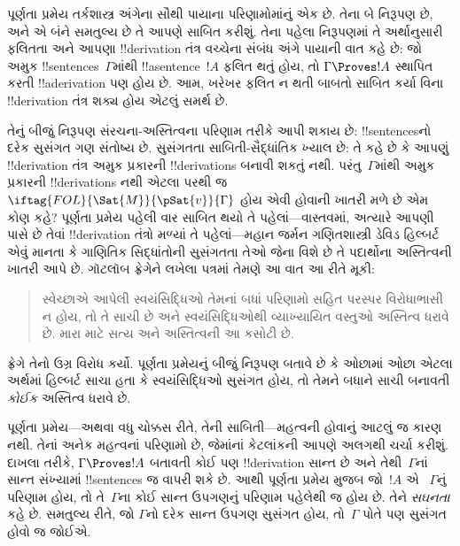\documentclass[../../../include/open-logic-section]{subfiles}
\begin{document}
      {}
      {}


પૂર્ણતા પ્રમેય તર્કશાસ્ત્ર અંગેના સૌથી પાયાના પરિણામોમાંનું એક છે.
તેના બે નિરૂપણ છે, અને એ બંને સમતુલ્ય છે તે આપણે સાબિત કરીશું. તેના
પહેલા નિરૂપણમાં તે અર્થાનુસારી ફલિતતા અને આપણા !!{derivation} તંત્ર
વચ્ચેના સંબંધ અંગે પાયાની વાત કહે છે: જો અમુક !!{sentence}s~$\Gamma$માંથી
!!a{sentence}~$!A$ ફલિત થતું હોય, તો $\Gamma \Proves !A$ સ્થાપિત કરતી
!!a{derivation} પણ હોય છે. આમ, ખરેખર ફલિત ન થતી બાબતો સાબિત કર્યા વિના
!!{derivation} તંત્ર શક્ય હોય એટલું સમર્થ છે.

તેનું બીજું નિરૂપણ સંરચના-અસ્તિત્વના પરિણામ તરીકે આપી શકાય છે:
!!{sentence}sનો દરેક સુસંગત ગણ સંતોષ્ય છે. સુસંગતતા સાબિતી-સૈદ્ધાંતિક
ખ્યાલ છે: તે કહે છે કે આપણું !!{derivation} તંત્ર અમુક પ્રકારની
!!{derivation}s બનાવી શકતું નથી. પરંતુ~$\Gamma$માંથી અમુક પ્રકારની
!!{derivation}s નથી એટલા પરથી જ $\iftag{FOL}{\Sat{M}}{\pSat{v}}{\Gamma}$
હોય એવી 
હોવાની ખાતરી મળે છે એમ કોણ કહે? પૂર્ણતા પ્રમેય પહેલી વાર સાબિત થયો
તે પહેલાં—વાસ્તવમાં, અત્યારે આપણી પાસે છે તેવાં !!{derivation} તંત્રો
મળ્યાં તે પહેલાં—મહાન જર્મન ગણિતશાસ્ત્રી ડેવિડ હિલ્બર્ટ એવું માનતા કે
ગાણિતિક સિદ્ધાંતોની સુસંગતતા તેઓ જેના વિશે છે તે પદાર્થોના અસ્તિત્વની
ખાતરી આપે છે. ગૉટલૉબ ફ્રેગેને લખેલા પત્રમાં તેમણે આ વાત આ રીતે મૂકી:
\begin{quote}
  સ્વેચ્છાએ આપેલી સ્વયંસિદ્ધિઓ તેમનાં બધાં પરિણામો સહિત પરસ્પર
  વિરોધાભાસી ન હોય, તો તે સાચી છે અને સ્વયંસિદ્ધિઓથી વ્યાખ્યાયિત
  વસ્તુઓ અસ્તિત્વ ધરાવે છે. મારા માટે સત્ય અને અસ્તિત્વની આ કસોટી છે.
\end{quote}
ફ્રેગે તેનો ઉગ્ર વિરોધ કર્યો. પૂર્ણતા પ્રમેયનું બીજું નિરૂપણ બતાવે છે
કે ઓછામાં ઓછા એટલા અર્થમાં હિલ્બર્ટ સાચા હતા કે સ્વયંસિદ્ધિઓ સુસંગત
હોય, તો તેમને બધાને સાચી બનાવતી \emph{કોઈક}
 અસ્તિત્વ ધરાવે છે.

પૂર્ણતા પ્રમેય—અથવા વધુ ચોક્કસ રીતે, તેની સાબિતી—મહત્વની હોવાનું આટલું
જ કારણ નથી. તેનાં અનેક મહત્વનાં પરિણામો છે, જેમાંનાં કેટલાંકની આપણે
અલગથી ચર્ચા કરીશું. દાખલા તરીકે, $\Gamma \Proves !A$ બતાવતી કોઈ પણ
!!{derivation} સાન્ત છે અને તેથી~$\Gamma$નાં સાન્ત સંખ્યામાં
!!{sentence}s જ વાપરી શકે છે. આથી પૂર્ણતા પ્રમેય મુજબ જો~$!A$ એ
~$\Gamma$નું પરિણામ હોય, તો તે~$\Gamma$ના કોઈ સાન્ત ઉપગણનું પરિણામ
પહેલેથી જ હોય છે. તેને \emph{સઘનતા} કહે છે. સમતુલ્ય રીતે, જો
$\Gamma$નો દરેક સાન્ત ઉપગણ સુસંગત હોય, તો~$\Gamma$ પોતે પણ સુસંગત
હોવો જ જોઈએ.
\end{document}
